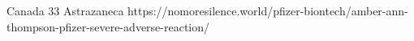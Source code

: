           {Canada}
          {33}
          {Astrazaneca}
          {}
          {
          }
          {https://nomoresilence.world/pfizer-biontech/amber-ann-thompson-pfizer-severe-adverse-reaction/}


